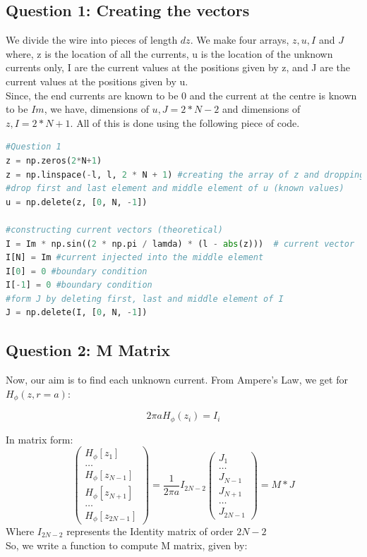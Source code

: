 \documentclass[11pt, a4paper]{article}
\begin{document}
\subsection{Question 1: Creating the vectors}
We divide the wire into pieces of length $dz$. We make four arrays, $z, u, I$ and $J$ where, z is the location of all the currents, u is the location of the unknown currents only, I are the current values at the positions given by z, and J are the current values at the positions given by u. \\Since, the end currents are known to be $0$ and the current at the centre is known to be $Im$, we have, dimensions of $u, J = 2*N-2$ and dimensions of $z, I = 2*N+1$. All of this is done using the following piece of code.\\ 

\begin{lstlisting}[language = Python]
#Question 1
z = np.zeros(2*N+1)
z = np.linspace(-l, l, 2 * N + 1) #creating the array of z and dropping certain values to obtain the array of u
#drop first and last element and middle element of u (known values)
u = np.delete(z, [0, N, -1])

#constructing current vectors (theoretical)
I = Im * np.sin((2 * np.pi / lamda) * (l - abs(z)))  # current vector
I[N] = Im #current injected into the middle element
I[0] = 0 #boundary condition
I[-1] = 0 #boundary condition
#form J by deleting first, last and middle element of I
J = np.delete(I, [0, N, -1])
\end{lstlisting}

\subsection{Question 2: M Matrix}
Now, our aim is to find each unknown current. From Ampere's Law, we get for $H_\phi(z, r = a)$:

\begin{equation*}
    2\pi a H_\phi(z_i) = I_i
\end{equation*}

In matrix form:
\begin{equation*}
    \begin{pmatrix}
        H_\phi[z_1] \\ \dots \\ H_\phi[z_{N-1}] \\ H_\phi[z_{N+1}] \\ \dots \\ H_\phi[z_{2N-1}]
    \end{pmatrix}
    = \frac{1}{2\pi a} I_{2N-2}
    \begin{pmatrix}
        J_1 \\ \dots \\ J_{N-1} \\ J_{N+1} \\ \dots \\ J_{2N-1}
    \end{pmatrix}
    = M * J
\end{equation*}
Where $I_{2N-2}$ represents the Identity matrix of order $2N-2$\\ 
So, we write a function to compute M matrix, given by:\\
\end{document}
